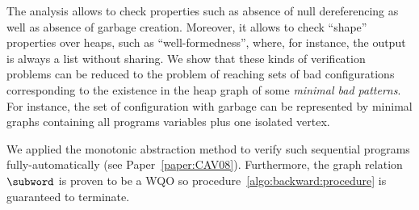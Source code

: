 The analysis allows to check properties such as absence of null
dereferencing as well as absence of garbage creation. Moreover, it
allows to check ``shape'' properties over heaps, such as
``well-formedness'', where, for instance, the output is always a list
without sharing. We show that these kinds of verification problems can
be reduced to the problem of reaching sets of bad configurations
corresponding to the existence in the heap graph of some \emph{minimal
  bad patterns}.
%
For instance, the set of configuration with garbage can be
represented by minimal graphs containing all programs variables plus
one isolated vertex.

We applied the monotonic abstraction method to verify such sequential
programs fully-automatically (see Paper~\ref{paper:CAV08}).
%
Furthermore, the graph relation $\subword$ is proven to be a WQO so
procedure~\ref{algo:backward:procedure} is guaranteed to terminate.
